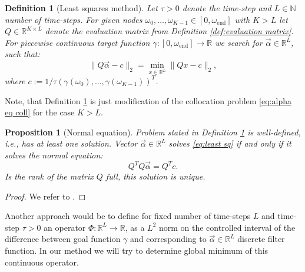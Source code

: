 \documentclass[a4paper,11pt,bibliography=totoc,listof=totoc,headinclude=true,cleardoublepage=empty,oneside]{scrbook}
\newtheorem{definition}[theorem]{Definition}
\newtheorem{prop}[theorem]{Proposition}
\newcommand{\R}{\mathbb{R}}
\newcommand{\N}{\mathbb{N}}
\newcommand{\e}{\mathrm{end}}
\begin{document}
\begin{definition}[Least squares method]\label{def:least sq}
    Let $\tau>0$ denote the time-step and $L \in \N$ number of time-steps. For given nodes $\omega_0, \dots, \omega_{K-1} \in [0, \omega_\e]$ with $K>L$ let $Q\in\R^{K\times L}$ denote the evaluation matrix from Definition \ref{def:evaluation matrix}. For piecewise continuous target function $\gamma : [0, \omega_\e] \rightarrow \R$ we search for $\Vec{\alpha} \in \R^{L}$, such that:
    \begin{equation}\label{eq:least sq}
        \| Q\vec{\alpha} - c \|_2 = \min_{x\in \R^L} \| Qx - c \|_2,
    \end{equation}
    where $c := 1/\tau \left(\gamma(\omega_0), \dots, \gamma(\omega_{K-1})\right)^T$.
\end{definition}

Note, that Definition \ref{def:least sq} is just modification of the collocation problem \eqref{eq:alpha eq coll} for the case $K>L$.

\begin{prop}[Normal equation]\label{prop:normal eq}
    Problem stated in Definition \ref{def:least sq} is well-defined, i.e., has at least one solution. Vector $\Vec{\alpha} \in \R^{L}$ solves \eqref{eq:least sq} if and only if it solves the normal equation:
    \begin{equation}\label{eq:normal eq}
        Q^T Q \Vec{\alpha} = Q^T c.
    \end{equation}
    Is the rank of the matrix $Q$ full, this solution is unique.
\end{prop}
\begin{proof}
    We refer to \cite[p. 103]{Praetorius}.
\end{proof}

Another approach would be to define for fixed number of time-steps $L$ and time-step $\tau>0$ an operator $\Phi: \R^L \rightarrow \R$, as a $L^2$ norm on the controlled interval of the difference between goal function $\gamma$ and corresponding to $\Vec{\alpha} \in \R^L$ discrete filter function. In our method we will try to determine global minimum of this continuous operator.
\end{document}
